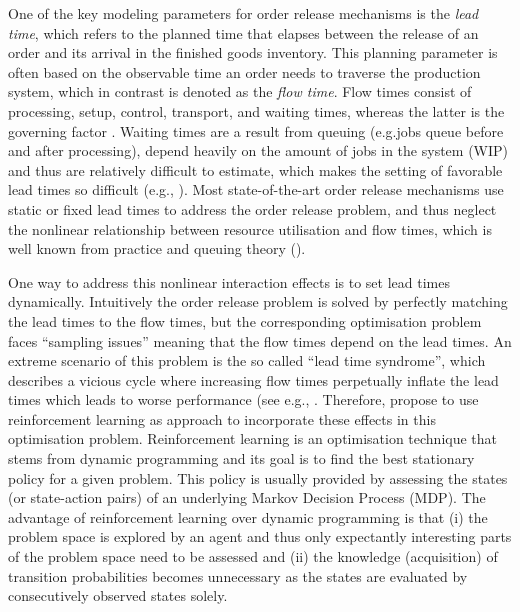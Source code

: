 \documentclass[envcountsame]{llncs}
\begin{document}
One of the key modeling parameters for order release mechanisms is the \textit{lead time}, which
refers to the planned time that elapses between the release of an order and its arrival in the
finished goods inventory. This planning parameter is often based on the observable time an order
needs to traverse the production system, which in contrast is denoted as the \textit{flow time}.
Flow times consist of processing, setup, control, transport, and waiting times, whereas the latter
is the governing factor \citep[][p.223]{zapfel1982produktionswirtschaft}. Waiting times are a result
from queuing (e.g.\@ jobs queue before and after processing), depend heavily on the amount of jobs in
the system (WIP) and thus are relatively difficult to estimate, which makes the
setting of favorable lead times so difficult (e.g., \citealt{Tatsiopoulos1983, Wiendahl1995}). Most
state-of-the-art order release mechanisms use static or fixed lead times to address the order
release problem, and thus neglect the nonlinear relationship between resource utilisation and flow
times, which is well known from practice and queuing theory (\citealt{Pahl2007}).

One way to address this nonlinear interaction effects is to set lead times dynamically. Intuitively
the order release problem is solved by perfectly matching the lead times to the flow times, but the
corresponding optimisation problem faces ``sampling issues'' meaning that the flow times depend on
the lead times. An extreme scenario of this problem is the so called ``lead time syndrome'', which
describes a vicious cycle where increasing flow times perpetually inflate the lead times which leads
to worse performance (see e.g., \citealt{Mather1978, knollmann2013control, Selcuk2006}. Therefore,
\citet{SchneckenreitherHaeussler2019} propose to use reinforcement learning as approach to
incorporate these effects in this optimisation problem. Reinforcement learning is an optimisation
technique that stems from dynamic programming and its goal is to find the best stationary policy for
a given problem. This policy is usually provided by assessing the states (or state-action pairs) of
an underlying Markov Decision Process (MDP). The advantage of reinforcement learning over dynamic
programming is that (i) the problem space is explored by an agent and thus only expectantly
interesting parts of the problem space need to be assessed and (ii) the knowledge (acquisition) of
transition probabilities becomes unnecessary as the states are evaluated by consecutively observed
states solely.
\end{document}
